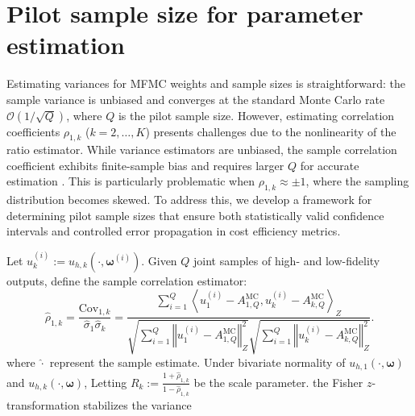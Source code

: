 \section{Pilot sample size for parameter estimation}\label{sec:Parameter_Estimation}

Estimating variances for MFMC weights and sample sizes is straightforward: the sample variance is unbiased and converges at the standard Monte Carlo rate $\mathcal{O}(1/\sqrt{Q})$, where $Q$ is the pilot sample size. However, estimating correlation coefficients $\rho_{1,k}$ ($k=2,\dots,K$) presents challenges due to the nonlinearity of the ratio estimator. While variance estimators are unbiased, the sample correlation coefficient exhibits finite-sample bias and requires larger $Q$ for accurate estimation \cite{Fi:1915,Ha:2007,Ri:1932,So:1913}. This is particularly problematic when $\rho_{1,k}\approx \pm 1$, where the sampling distribution becomes skewed. To address this, we develop a framework for determining pilot sample sizes that ensure both statistically valid confidence intervals and controlled error propagation in cost efficiency metrics.







Let $u_k^{(i)} := u_{h,k}(\cdot, \boldsymbol{\omega}^{(i)})$. Given $Q$ joint samples of high- and low-fidelity outputs, define the sample correlation estimator:
%
\[
\widehat\rho_{1,k} = \frac{\widehat{\text{Cov}}_{1,k}}{\widehat\sigma_1 \widehat\sigma_k} = \frac{\sum_{i=1}^Q\left\langle u_{1}^{(i)} - A_{1,Q}^{\text{MC}},  u_{k}^{(i)} - A_{k,Q}^{\text{MC}} \right\rangle_Z}{\sqrt{\sum_{i=1}^Q \left\Vert u_{1}^{(i)} - A_{1,Q}^{\text{MC}}\right\Vert_Z^2 } \sqrt{\sum_{i=1}^Q \left\Vert u_{k}^{(i)} - A_{k,Q}^{\text{MC}}\right\Vert_Z^2}}.
\]
%
where $\widehat \cdot$ represent the sample estimate. Under bivariate normality of $u_{h,1}(\cdot, \boldsymbol{\omega})$ and $u_{h,k}(\cdot, \boldsymbol{\omega})$, Letting $R_k := \frac{1 + \widehat \rho_{1,k}}{1 - \widehat \rho_{1,k}}$ be the scale parameter. the Fisher $z$-transformation \cite{BiHi:2017,BoWr:1998, FiHaPe:1957,Fi:1915, Fi:1921} stabilizes the variance


